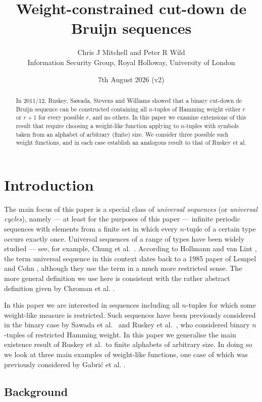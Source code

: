\documentclass[a4paper,11pt]{article}
\title{Weight-constrained cut-down de Bruijn sequences}
\author{Chris J Mitchell and Peter R Wild\\Information Security Group, Royal Holloway, University of London}
\date{7th August 2026 (v2)}
\theoremstyle{plain}
\theoremstyle{definition}
\theoremstyle{remark}
\begin{document}
\maketitle

\begin{abstract}
In 2011/12, Ruskey, Sawada, Stevens and Williams showed that a binary cut-down de Bruijn
sequence can be constructed containing all $n$-tuples of Hamming weight either $r$ or $r+1$ for
every possible $r$, and no others.  In this paper we examine extensions of this result that
require choosing a weight-like function applying to $n$-tuples with symbols taken from an
alphabet of arbitrary (finite) size. We consider three possible such weight functions, and in
each case establish an analogous result to that of Ruskey et al.
\end{abstract}

\section{Introduction} \label{section:introduction}

The main focus of this paper is a special class of \emph{universal sequences} (or \emph{universal
cycles}), namely --- at least for the purposes of this paper --- infinite periodic sequences with
elements from a finite set in which every $n$-tuple of a certain type occurs exactly once.
Universal sequences of a range of types have been widely studied --- see, for example, Chung et
al.\ \cite{Chung92}. According to Hollmann and van Lint \cite{Hollmann97}, the term universal
sequence in this context dates back to a 1985 paper of Lempel and Cohn \cite{Lempel85}, although
they use the term in a much more restricted sense. The more general definition we use here is
consistent with the rather abstract definition given by Chroman et al. \cite{Chroman21}.

In this paper we are interested in sequences including all $n$-tuples for which some
weight-like measure is restricted.  Such sequences have been previously considered in the
binary case by Sawada et al.~\cite{Sawada11} and Ruskey et al.~\cite{Ruskey12}, who considered
binary $n$-tuples of restricted Hamming weight. In this paper we generalise the main existence
result of Ruskey et al.\ to finite alphabets of arbitrary size. In doing so we look at three
main examples of weight-like functions, one case of which was previously considered by
Gabri\'{c} et al. \cite{Gabric20}.

\subsection{Background}
\end{document}
